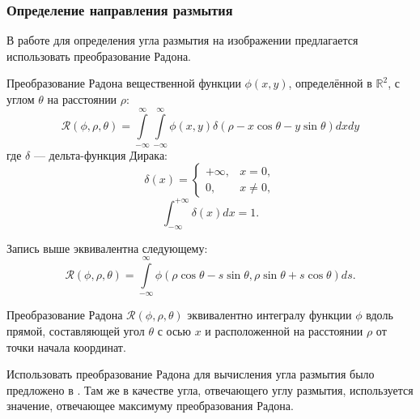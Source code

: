 \subsubsection{Определение направления размытия}

В работе для определения угла размытия на изображении предлагается использовать преобразование Радона.

Преобразование Радона вещественной функции $\phi(x, y)$,
определённой в $\mathbb{R}^{2}$, с углом $\theta$ на расстоянии $\rho$:
$$
\mathcal{R}(\phi, \rho, \theta)=\int\limits_{-\infty}^{\infty} \int\limits_{-\infty}^{\infty} \phi(x, y) 
\delta(\rho-x \cos \theta-y \sin \theta) d x d y
$$
где $\delta$ --- дельта-функция Дирака:
$$\delta(x)=\left\{\begin{array}{cc}+\infty, & x=0, \\ 0, & x \neq 0,\end{array}\right.$$
$$
\int_{-\infty}^{+\infty} \delta(x) d x=1.
$$

Запись выше эквивалентна следующему:
$$
\mathcal{R}(\phi, \rho, \theta)=\int\limits_{-\infty}^{\infty} 
\phi(\rho \cos \theta-s \sin \theta, \rho \sin \theta+s \cos \theta) d s.
$$

Преобразование Радона $\mathcal{R}(\phi, \rho, \theta)$ 
эквивалентно интегралу функции $\phi$ вдоль прямой, составляющей угол $\theta$
с осью $x$ и расположенной на расстоянии $\rho$ от точки начала координат. 

\par

Использовать преобразование Радона для вычисления угла размытия было предложено в \cite{moghaddam}. 
Там же в качестве угла, отвечающего углу размытия, используется значение, отвечающее максимуму преобразования Радона. 

